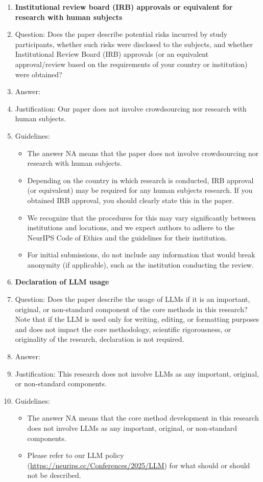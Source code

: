 \documentclass{article}
\theoremstyle{plain}
\begin{document}
\begin{enumerate}
\item {\bf Institutional review board (IRB) approvals or equivalent for research with human subjects}
    \item[] Question: Does the paper describe potential risks incurred by study participants, whether such risks were disclosed to the subjects, and whether Institutional Review Board (IRB) approvals (or an equivalent approval/review based on the requirements of your country or institution) were obtained?
    \item[] Answer: \answerNA{} %
    \item[] Justification: Our paper does not involve crowdsourcing nor research with human subjects.
    \item[] Guidelines:
    \begin{itemize}
        \item The answer NA means that the paper does not involve crowdsourcing nor research with human subjects.
        \item Depending on the country in which research is conducted, IRB approval (or equivalent) may be required for any human subjects research. If you obtained IRB approval, you should clearly state this in the paper. 
        \item We recognize that the procedures for this may vary significantly between institutions and locations, and we expect authors to adhere to the NeurIPS Code of Ethics and the guidelines for their institution. 
        \item For initial submissions, do not include any information that would break anonymity (if applicable), such as the institution conducting the review.
    \end{itemize}

\item {\bf Declaration of LLM usage}
    \item[] Question: Does the paper describe the usage of LLMs if it is an important, original, or non-standard component of the core methods in this research? Note that if the LLM is used only for writing, editing, or formatting purposes and does not impact the core methodology, scientific rigorousness, or originality of the research, declaration is not required.
    \item[] Answer: \answerNA{}
    \item[] Justification: This research does not involve LLMs as any important, original, or non-standard components.
    \item[] Guidelines:
    \begin{itemize}
        \item The answer NA means that the core method development in this research does not involve LLMs as any important, original, or non-standard components.
        \item Please refer to our LLM policy (\url{https://neurips.cc/Conferences/2025/LLM}) for what should or should not be described.
    \end{itemize}

\end{enumerate}
\end{document}

